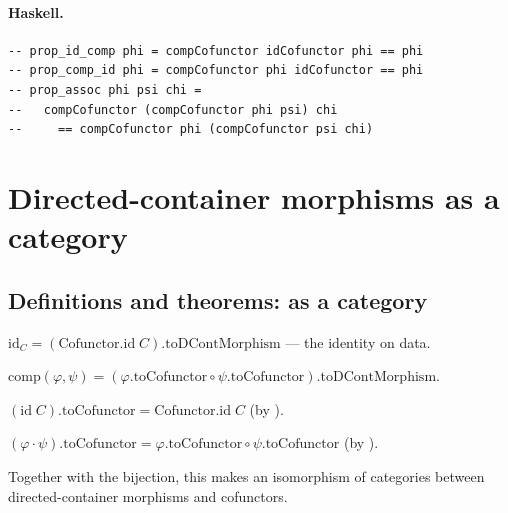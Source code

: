 \documentclass[11pt,a4paper]{article}
\begin{document}
\paragraph{Haskell.}
\begin{lstlisting}[style=haskell]
-- prop_id_comp phi = compCofunctor idCofunctor phi == phi
-- prop_comp_id phi = compCofunctor phi idCofunctor == phi
-- prop_assoc phi psi chi =
--   compCofunctor (compCofunctor phi psi) chi
--     == compCofunctor phi (compCofunctor psi chi)
\end{lstlisting}


\section{Directed-container morphisms as a category}

\subsection{Definitions and theorems:  as a category}

\begin{defn}
$\mathrm{id}_C = (\mathrm{Cofunctor.id}\;C).\mathrm{toDContMorphism}$ --- the identity on data.
\end{defn}

\begin{defn}
$\mathrm{comp}(\varphi, \psi) = (\varphi.\mathrm{toCofunctor} \circ \psi.\mathrm{toCofunctor}).\mathrm{toDContMorphism}$.
\end{defn}

\begin{thm}
$(\mathrm{id}\;C).\mathrm{toCofunctor} = \mathrm{Cofunctor.id}\;C$ (by ).
\end{thm}

\begin{thm}
$(\varphi \cdot \psi).\mathrm{toCofunctor} = \varphi.\mathrm{toCofunctor} \circ \psi.\mathrm{toCofunctor}$
(by ).

Together with the  bijection, this makes  an
isomorphism of categories between directed-container morphisms and cofunctors.
\end{thm}
\end{document}

